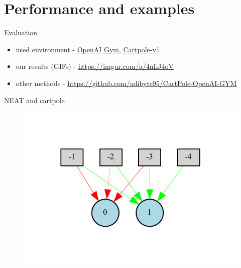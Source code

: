 \documentclass{beamer}
\begin{document}
\section{Performance and examples}
\begin{frame}{Evaluation}
    \begin{itemize}
        \item used environment - \href{https://gym.openai.com}{OpenAI Gym, Cartpole-v1}
        \item our results (GIFs) - \href{https://imgur.com/a/4nLJ4oV}{https://imgur.com/a/4nLJ4oV}
        \item other methods - \href{https://github.com/adibyte95/CartPole-OpenAI-GYM}{https://github.com/adibyte95/CartPole-OpenAI-GYM}
    \end{itemize}
\end{frame}
\begin{frame}{NEAT and cartpole}
    \begin{figure}[c]
        \includegraphics[width=\textwidth]{pdf/neat_pole_balancing_winner.pdf}
    \end{figure}
\end{frame}
\end{document}
